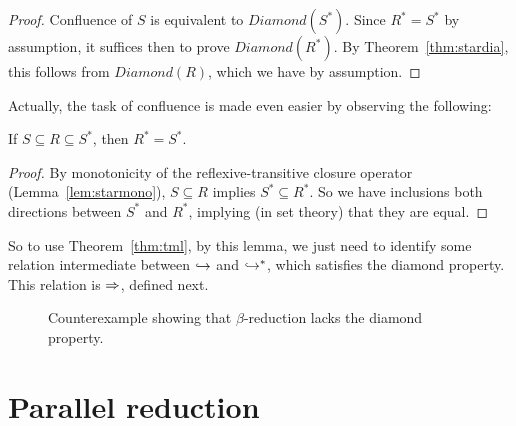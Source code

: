 \begin{proof}
  Confluence of $S$ is equivalent to $\textit{Diamond}(S^*)$.  Since $R^* = S^*$ by assumption, it suffices
  then to prove $\textit{Diamond}(R^*)$.  By Theorem~\ref{thm:stardia}, this follows
  from $\textit{Diamond}(R)$, which we have by assumption.
\end{proof}

Actually, the task of confluence is made even easier by observing the following:
\begin{lemma}
  If $S \subseteq R \subseteq S^*$, then $R^* = S^*$.
\end{lemma}
\begin{proof}
  By monotonicity of the reflexive-transitive closure operator (Lemma~\ref{lem:starmono}),
  $S \subseteq R$ implies $S^* \subseteq R^*$.  So we have inclusions both directions
  between $S^*$ and $R^*$, implying (in set theory) that they are equal.
  \end{proof}

\noindent So to use Theorem~\ref{thm:tml}, by this lemma, we just need to identify some relation
intermediate between $\hookrightarrow$ and $\hookrightarrow^*$, which satisfies the diamond property.  This relation
is $\Rightarrow$, defined next.

\begin{figure}

  \begin{center}
    \end{center}

\caption{Counterexample showing that $\beta$-reduction lacks the diamond property.}
\label{fig:betanodia}

\end{figure}

\section{Parallel reduction}

